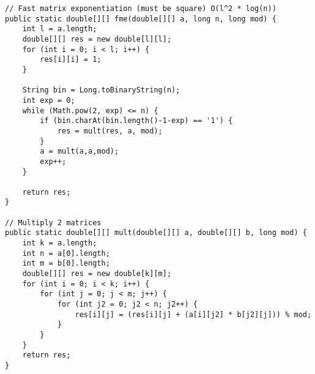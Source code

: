 \begin{verbatim}
// Fast matrix exponentiation (must be square) O(l^2 * log(n))
public static double[][] fme(double[][] a, long n, long mod) {
	int l = a.length;
	double[][] res = new double[l][l];
	for (int i = 0; i < l; i++) {
		res[i][i] = 1;
	}
	
	String bin = Long.toBinaryString(n);
	int exp = 0;
	while (Math.pow(2, exp) <= n) {
		if (bin.charAt(bin.length()-1-exp) == '1') {
			res = mult(res, a, mod);
		}
		a = mult(a,a,mod);
		exp++;
	}
	
	return res;
}

// Multiply 2 matrices
public static double[][] mult(double[][] a, double[][] b, long mod) {
	int k = a.length;
	int n = a[0].length;
	int m = b[0].length;
	double[][] res = new double[k][m];
	for (int i = 0; i < k; i++) {
		for (int j = 0; j < m; j++) {
			for (int j2 = 0; j2 < n; j2++) {
				res[i][j] = (res[i][j] + (a[i][j2] * b[j2][j])) % mod; 
			}
		}
	}
	return res;
}
\end{verbatim}